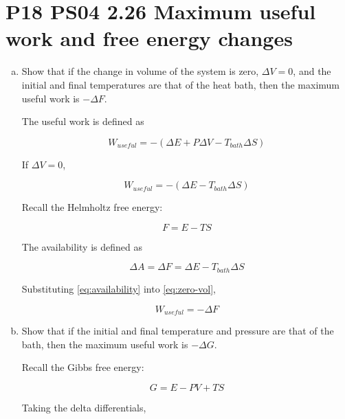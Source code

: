 \documentclass[9pt,a4paper,twocolumn]{article}
\begin{document}
\section{P18 PS04 2.26 Maximum useful work and free energy changes}

\begin{enumerate}[(a)]

\item Show that if the change in volume of the system is zero, $\Delta V = 0$, and the initial and final temperatures are that of the heat bath, then the maximum useful work is $-\Delta F$.

The useful work is defined as

\begin{equation}\label{eq:usefulwork}
	W_{useful} = -\left( \Delta E + P\Delta V - T_{bath} \Delta S \right)
\end{equation}

If $\Delta V = 0$,

\begin{equation}\label{eq:zero-vol}
	W_{useful} = -\left( \Delta E - T_{bath} \Delta S \right)
\end{equation}

Recall the Helmholtz free energy:

\begin{equation}\label{eq:helmholtz}
	F = E - TS
\end{equation}

The availability is defined as

\begin{equation}\label{eq:availability}
	\Delta A = \Delta F = \Delta E - T_{bath}\Delta S
\end{equation}

Substituting \eqref{eq:availability} into \eqref{eq:zero-vol},

\begin{equation}\label{eq:answer-a}
	\boxed{
		W_{useful} = -\Delta F
	}
\end{equation}

\item Show that if the initial and final temperature and pressure are that of the bath, then the maximum useful work is $-\Delta G$.

Recall the Gibbs free energy:

\begin{equation}\label{eq:gibbs}
	G = E - PV + TS
\end{equation}

Taking the delta differentials,


\end{enumerate}
\end{document}
